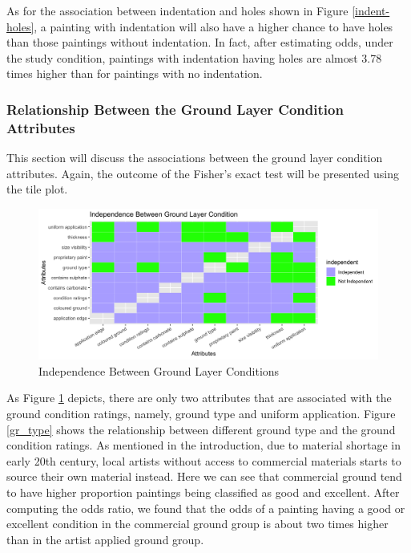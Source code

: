 \documentclass[11pt, oneside]{article}
\begin{document}
\noindent As for the association between indentation and holes shown in Figure \ref{indent-holes}, a painting with indentation will also have a higher chance to have holes than those paintings without indentation. In fact, after estimating odds, under the study condition, paintings with indentation having holes are almost 3.78 times higher than for paintings with no indentation.

\subsubsection{Relationship Between the Ground Layer Condition Attributes}
This section will discuss the associations between the ground layer condition attributes. Again, the outcome of the Fisher's exact test will be presented using the tile plot.

\begin{figure}[H]
    \centering
    \includegraphics[scale=0.15]{images/gr_tile.png}
    \caption{Independence Between Ground Layer Conditions}
    \label{gr_tile}
\end{figure}

\noindent As Figure \ref{gr_tile} depicts, there are only two attributes that are associated with the ground condition ratings, namely, ground type and uniform application. Figure \ref{gr_type} shows the relationship between different ground type and the ground condition ratings. As mentioned in the introduction, due to material shortage in early 20th century, local artists without access to commercial materials starts to source their own material instead. Here we can see that commercial ground tend to have higher proportion paintings being classified as good and excellent. After computing the odds ratio, we found that the odds of a painting having a good or excellent condition in the commercial ground group is about two times higher than in the artist applied ground group.
\end{document}

